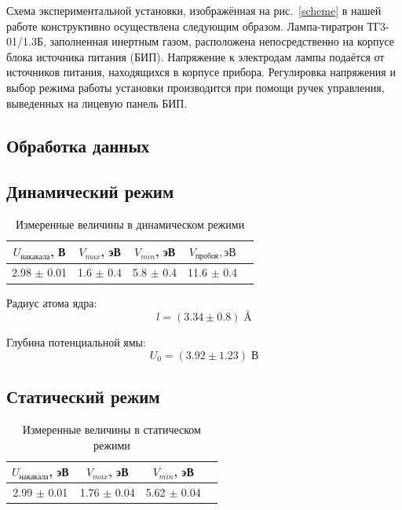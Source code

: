 \documentclass[a4paper,12pt]{article} %
\begin{document}
Схема экспериментальной установки, изображённая на рис.~\ref{scheme} в нашей работе конструктивно осуществлена следующим образом. Лампа-тиратрон ТГ3-01/1.3Б, заполненная инертным газом, расположена непосредственно на корпусе блока источника питания (БИП). Напряжение к электродам лампы подаётся от источников питания, находящихся в корпусе прибора. Регулировка напряжения и выбор режима работы установки производится при помощи ручек управления, выведенных на лицевую панель БИП.

\newpage

\begin{center}
    \section*{Обработка данных}
\end{center}

\subsection*{Динамический режим}

		\begin{table}[H]
			\caption{Измеренные величины в динамическом режими}
			\label{table:parametr}
			\begin{tabular}{|c|c|c|c|c|}
				\hline
				$U_{накакала}$, В & $V_{max}$, эВ & $V_{min}$, эВ & $V_{\text{пробоя}}, эВ $ \\ \hline
                2.98 $\pm$ 0.01 & 1.6 $\pm$ 0.4  & 5.8 $\pm$ 0.4 & 11.6 $\pm$ 0.4   \\ \hline
                
			\end{tabular}
		\end{table}

Радиус атома ядра:
$$
    l = (3.34 \pm 0.8) \; \si{\angstrom}
$$

Глубина потенциальной ямы:
$$
    U_0 = (3.92 \pm 1.23) \; \text{В}
$$
        
\subsection*{Статический режим}

		\begin{table}[H]
			\caption{Измеренные величины в статическом режими}
			\label{table:parametr}
			\begin{tabular}{|c|c|c|c|}
				\hline
				$U_{накакала}$, эВ & $V_{max}$, эВ & $V_{min}$, эВ  \\ \hline
                2.99 $\pm$ 0.01 & 1.76 $\pm$ 0.04 & 5.62 $\pm$ 0.04   \\ \hline
                
			\end{tabular}
		\end{table}
\end{document}
